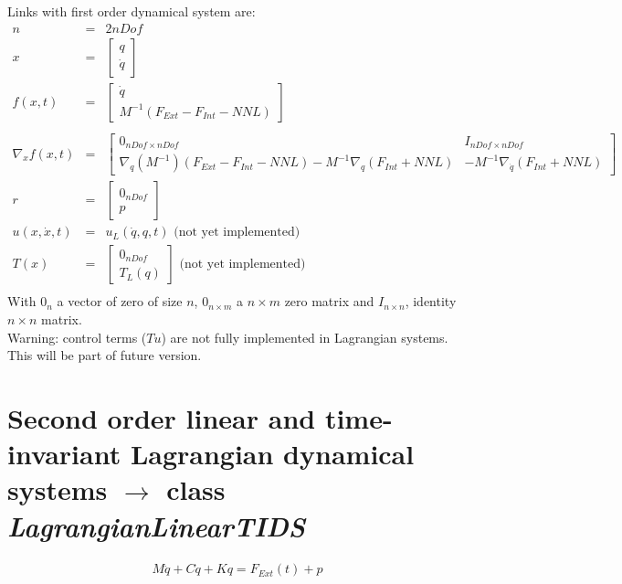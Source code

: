 \documentclass[10pt]{report}
\begin{document}
Links with first order dynamical system are: 
\begin{eqnarray}
  n &= &2nDof \\
  x &=&\left[\begin{array}{c}q \\ \dot q \end{array}\right] \\
  f(x,t) &=&  \left[\begin{array}{c} \dot q \\ M^{-1}(F_{Ext}-F_{Int}-NNL) \end{array}\right] \\
  \\
  \nabla_x f(x,t) &=& 
  \left[\begin{array}{cc} 
      0_{nDof\times nDof} & I_{nDof\times nDof} \\
      \nabla_q(M^{-1})(F_{Ext}-F_{Int}-NNL) -M^{-1}\nabla_q(F_{Int}+NNL) &  -M^{-1}\nabla_{\dot q}(F_{Int}+NNL) 
    \end{array}\right] \\
  r &=& \left[\begin{array}{c} 0_{nDof} \\ p \end{array}\right] \\
  u(x,\dot x,t) &=& u_L(\dot q, q, t) \text{  (not yet implemented)} \\
  T(x) &=& \left[\begin{array}{c} 0_{nDof} \\ T_L(q) \end{array}\right] \text{  (not yet implemented)} \\
\end{eqnarray}
With $0_{n}$ a vector of zero of size $n$, $0_{n\times m}$ a $n\times m$ zero matrix and
$I_{n\times n}$, identity $n\times n$ matrix. \\

Warning: control terms ($Tu$) are not fully implemented in Lagrangian systems. This will be part of future version.

\section{Second order linear and time-invariant Lagrangian dynamical systems $\rightarrow$ class \it{LagrangianLinearTIDS}}
\label{Sec:LagrangianLineatTIDS}
\begin{eqnarray}
M \ddot q + C \dot q + K q =  F_{Ext}(t) + p
\end{eqnarray}
\end{document}
